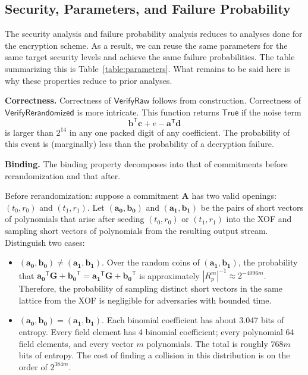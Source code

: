 \subsection{Security, Parameters, and Failure Probability}

The security analysis and failure probability analysis reduces to analyses done for the encryption scheme. As a result, we can reuse the same parameters for the same target security levels and achieve the same failure probabilities. The table summarizing this is Table~\ref{table:parameters}. What remains to be said here is why these properties reduce to prior analyses.

\textbf{Correctness.} Correctness of $\mathsf{VerifyRaw}$ follows from construction. Correctness of $\mathsf{VerifyRerandomized}$ is more intricate. This function returns $\mathsf{True}$ if the noise term
\begin{equation*}
\mathbf{b}^\mathsf{T} \mathbf{c} + e  - \mathbf{a}^\mathsf{T} \mathbf{d}
\end{equation*}
is larger than $2^{14}$ in any one packed digit of any coefficient. The probability of this event is (marginally) less than the probability of a decryption failure.

\textbf{Binding.} The binding property decomposes into that of commitments before rerandomization and that after.

Before rerandomization: suppose a commitment $\mathbf{A}$ has two valid openings: $(t_0, r_0)$ and $(t_1, r_1)$. Let $(\mathbf{a_0}, \mathbf{b_0})$ and $(\mathbf{a_1}, \mathbf{b_1})$ be the pairs of short vectors of polynomials that arise after seeding $(t_0, r_0)$ or $(t_1, r_1)$ into the XOF and sampling short vectors of polynomials from the resulting output stream. Distinguish two cases:
\begin{itemize}
 \item $(\mathbf{a_0}, \mathbf{b_0}) \neq (\mathbf{a_1}, \mathbf{b_1})$. Over the random coins of $(\mathbf{a_1}, \mathbf{b_1})$, the probability that $\mathbf{a_0}^\mathsf{T} \mathbf{G} + \mathbf{b_0}^\mathsf{T} = \mathbf{a_1}^\mathsf{T} \mathbf{G} + \mathbf{b_0}^\mathsf{T}$ is approximately $|R_p^m|^{-1} \approx 2^{-4096m}$. Therefore, the probability of sampling distinct short vectors in the same lattice from the XOF is negligible for adversaries with bounded time.
 \item $(\mathbf{a_0}, \mathbf{b_0}) = (\mathbf{a_1}, \mathbf{b_1})$. Each binomial coefficient has about 3.047 bits of entropy. Every field element has 4 binomial coefficient; every polynomial 64 field elements, and every vector $m$ polynomials. The total is roughly $768 m$ bits of entropy. The cost of finding a collision in this distribution is on the order of $2^{384 m}$.
\end{itemize}

